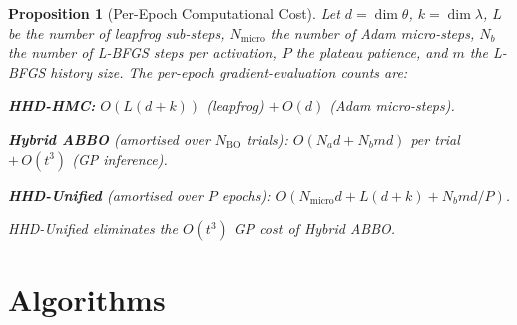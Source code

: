 \documentclass[11pt]{article}
\newtheorem{proposition}[theorem]{Proposition}
\theoremstyle{definition}
\begin{document}
\begin{proposition}[Per-Epoch Computational Cost]
\label{prop:cost}
Let $d=\dim\theta$, $k=\dim\lambda$, $L$ be the number of leapfrog
sub-steps, $N_{\mathrm{micro}}$ the number of Adam micro-steps, $N_b$
the number of L-BFGS steps per activation, $P$ the plateau patience,
and $m$ the L-BFGS history size. The per-epoch gradient-evaluation
counts are:

\noindent\textbf{HHD-HMC:} $O(L(d+k))$ (leapfrog)
$+\,O(d)$ (Adam micro-steps).

\noindent\textbf{Hybrid ABBO} (amortised over $N_{\mathrm{BO}}$ trials):
$O(N_a d + N_b m d)$ per trial $+\,O(t^3)$ (GP inference).

\noindent\textbf{HHD-Unified} (amortised over $P$ epochs):
$O(N_{\mathrm{micro}} d + L(d+k) + N_b m d/P)$.

HHD-Unified eliminates the $O(t^3)$ GP cost of Hybrid ABBO.
\end{proposition}


\section{Algorithms}
\end{document}
